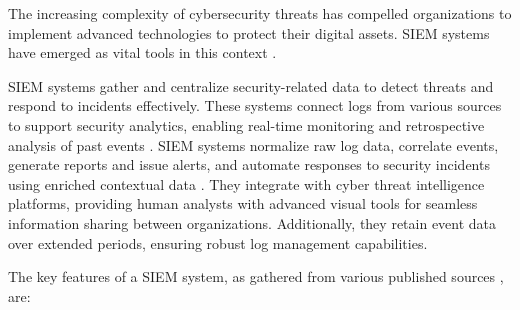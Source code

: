 The increasing complexity of cybersecurity threats has compelled organizations to implement advanced technologies to protect their digital assets. 
\gls{SIEM} systems have emerged as vital tools in this context \parencite{Shaw2022}.

\gls{SIEM} systems gather and centralize security-related data to detect threats and respond to incidents effectively. 
These systems connect logs from various sources to support security analytics, enabling real-time monitoring and retrospective analysis of past events \parencite{Shaw2022}.
\gls{SIEM} systems normalize raw log data, correlate events, generate reports and issue alerts, and automate responses to security incidents using enriched contextual data \parencite{Vielberth2021}. 
They integrate with cyber threat intelligence platforms, providing human analysts with advanced visual tools for seamless information sharing between organizations. 
Additionally, they retain event data over extended periods, ensuring robust log management capabilities.

The key features of a \gls{SIEM} system, as gathered from various published sources \parencite{Harper2010, Sheeraz2023, Ali2024}, are:

